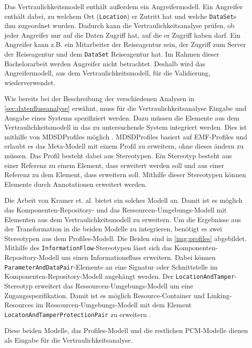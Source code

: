 Das Vertraulichkeitsmodell enthält außerdem ein Angreifermodell. Ein Angreifer enthält dabei, zu welchem Ort (\texttt{Location}) er Zutritt hat und welche \texttt{DataSet}s ihm zugeordnet wurden. Dadurch kann die Vertraulichkeitsanalyse prüfen, ob jeder Angreifer nur auf die Daten Zugriff hat, auf die er Zugriff haben darf. Ein Angreifer kann z.B. ein Mitarbeiter der Reiseagentur sein, der Zugriff zum Server der Reiseagentur und dem \texttt{DataSet} Reiseagentur hat. Im Rahmen dieser Bachelorarbeit werden Angreifer nicht betrachtet. Deshalb wird das Angreifermodell, aus dem Vertraulichkeitsmodell, für die Validierung, wiederverwendet. \par
Wie bereits bei der Beschreibung der verschiedenen Analysen in \autoref{sec:datenflussanalyse} erwähnt, muss für die Vertraulichkeitsanalyse Eingabe und Ausgabe eines Systems spezifiziert werden. Dazu müssen die Elemente aus dem Vertraulichkeitsmodell in das zu untersuchende System integriert werden. Dies ist mithilfe von MDSDProfiles möglich \cite{Kramer2012}. MDSDProfiles basiert auf EMF-Profiles \cite{EmfProfiles} und erlaubt es das Meta-Modell mit einem Profil zu erweitern, ohne dieses ändern zu müssen.  
Das Profil besteht dabei aus Stereotypen. Ein Stereotyp besteht aus einer Referenz zu einem Element, dass erweitert werden soll und aus einer Referenz zu dem Element, dass erweitern soll. Mithilfe dieser Stereotypen können Elemente durch Annotationen erweitert werden. \par
Die Arbeit von Kramer et. al. \cite{Kramera} bietet ein solches Modell an. Damit ist es möglich das Komponenten-Repository- und das Ressourcen-Umgebungs-Modell mit Elementen aus dem Vertraulichkeitsmodell zu erweitern. Um die Ergebnisse aus der Transformation in die beiden Modelle zu integrieren, benötigt es zwei Stereotypen aus dem Profiles-Modell. Die Beiden sind in \autoref{img:profiles} abgebildet. Mithilfe des \texttt{InformationFlow}-Stereotypen lässt sich das Komponenten-Repository-Modell um einen Informationsfluss erweitern. Dabei können \texttt{ParameterAndDataPair}-Elemente an eine Signatur oder Schnittstelle im Komponenten-Repository-Modell angehängt werden. Der \texttt{LocationAndTamper}-Stereotyp erweitert das Ressourcen-Umgebungs-Modell um eine Zugangsspezifikation. Damit ist es möglich Resource-Container und Linking-Resources im Ressourcen-Umgebungs-Modell mit dem Element \texttt{LocatonAndTamperProtectionPair} zu erweitern . \par
Diese beiden Modelle, das Profiles-Modell und die restlichen PCM-Modelle dienen als Eingabe für die Vertraulichkeitsanalyse. \par

